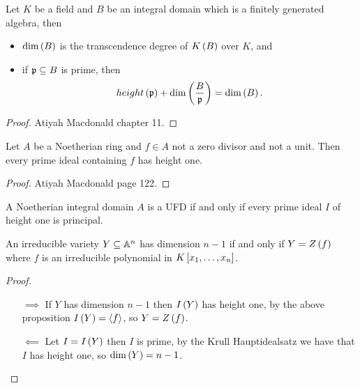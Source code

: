 \begin{proposition}
Let $ K $ be a field and $ B $ be an integral domain which is a finitely generated algebra, then
\begin{itemize}
\item $ \dim\rb{B} $ is the transcendence degree of $ K\rb{B} $ over $ K $, and
\item if $ \pp \subseteq B $ is prime, then
$$ height\rb{\pp} + \dim\rb{\dfrac{B}{\pp}} = \dim\rb{B}. $$
\end{itemize}
\end{proposition}

\begin{proof}
Atiyah Macdonald chapter 11.
\end{proof}

\begin{proposition}
Let $ A $ be a Noetherian ring and $ f \in A $ not a zero divisor and not a unit. Then every prime ideal containing $ f $ has height one.
\end{proposition}

\begin{proof}
Atiyah Macdonald page 122.
\end{proof}


\begin{proposition}
A Noetherian integral domain $ A $ is a UFD if and only if every prime ideal $ I $ of height one is principal.
\end{proposition}

\begin{theorem}
An irreducible variety $ Y \subseteq \A^n $ has dimension $ n - 1 $ if and only if $ Y = Z\rb{f} $ where $ f $ is an irreducible polynomial in $ K\sb{x_1, \dots, x_n} $.
\end{theorem}

\begin{proof}
\hfill
\begin{itemize}
\item[$ \implies $] If $ Y $ has dimension $ n - 1 $ then $ I\rb{Y} $ has height one, by the above proposition $ I\rb{Y} = \ab{f} $, so $ Y = Z\rb{f} $.
\item[$ \impliedby $] Let $ I = I\rb{Y} $ then $ I $ is prime, by the Krull Hauptidealsatz we have that $ I $ has height one, so $ \dim\rb{Y} = n - 1 $.
\end{itemize}
\end{proof}

